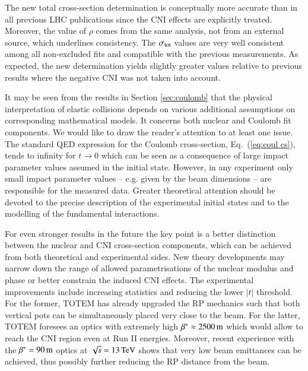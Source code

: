 The new total cross-section determination is conceptually more accurate than in all previous LHC publications since the CNI effects are explicitly treated. Moreover, the value of $\rho$ comes from the same analysis, not from an external source, which underlines consistency. The $\sigma_{\rm tot}$ values are very well consistent among all non-excluded fits and compatible with the previous measurements. As expected, the new determination yields slightly greater values relative to previous results where the negative CNI was not taken into account.

It may be seen from the results in Section \ref{sec:coulomb} that the physical interpretation of elastic collisions depends on various additional assumptions on corresponding mathematical models. It concerns both nuclear and Coulomb fit components. We would like to draw the reader's attention to at least one issue. The standard QED expression for the Coulomb cross-section, Eq.~(\ref{eq:coul cs}), tends to infinity for $t\to 0$ which can be seen as a consequence of large impact parameter values assumed in the initial state. However, in any experiment only small impact parameter values -- e.g. given by the beam dimensions -- are responsible for the measured data. Greater theoretical attention should be devoted to the precise description of the experimental initial states and to the modelling of the fundamental interactions.

For even stronger results in the future the key point is a better distinction between the nuclear and CNI cross-section components, which can be achieved from both theoretical and experimental sides. New theory developments may narrow down the range of allowed parametrisations of the nuclear modulus and phase or better constrain the induced CNI effects. The experimental improvements include increasing statistics and reducing the lower $|t|$ threshold. For the former, TOTEM has already upgraded the RP mechanics such that both vertical pots can be simultaneously placed very close to the beam. For the latter, TOTEM foresees an optics with extremely high $\beta^* \approx 2500\,{\rm m}$ which would allow to reach the CNI region even at Run II energies. Moreover, recent experience with the $\beta^* = 90\,{\rm m}$ optics at $\sqrt s = 13\,{\rm TeV}$ shows that very low beam emittances can be achieved, thus possibly further reducing the RP distance from the beam.
